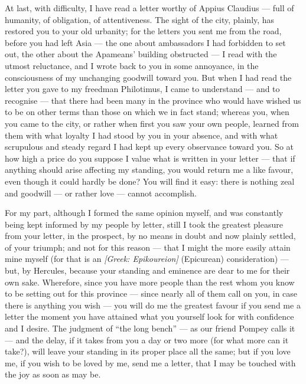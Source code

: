 

 At last, with difficulty, I have read a letter worthy of Appius Claudius --- full of humanity, of obligation, of attentiveness. The sight of the city, plainly, has restored you to your old urbanity; for the letters you sent me from the road, before you had left Asia --- the one about ambassadors I had forbidden to set out, the other about the Apameans' building obstructed --- I read with the utmost reluctance, and I wrote back to you in some annoyance, in the consciousness of my unchanging goodwill toward you. But when I had read the letter you gave to my freedman Philotimus, I came to understand --- and to recognise --- that there had been many in the province who would have wished us to be on other terms than those on which we in fact stand; whereas you, when you came to the city, or rather when first you saw your own people, learned from them with what loyalty I had stood by you in your absence, and with what scrupulous and steady regard I had kept up every observance toward you. So at how high a price do you suppose I value what is written in your letter --- that if anything should arise affecting my standing, you would return me a like favour, even though it could hardly be done? You will find it easy: there is nothing zeal and goodwill --- or rather love --- cannot accomplish.

 For my part, although I formed the same opinion myself, and was constantly being kept informed by my people by letter, still I took the greatest pleasure from your letter, in the prospect, by no means in doubt and now plainly settled, of your triumph; and not for this reason --- that I might the more easily attain mine myself (for that is an \textit{[Greek: Epikoureion]} (Epicurean) consideration) --- but, by Hercules, because your standing and eminence are dear to me for their own sake. Wherefore, since you have more people than the rest whom you know to be setting out for this province --- since nearly all of them call on you, in case there is anything you wish --- you will do me the greatest favour if you send me a letter the moment you have attained what you yourself look for with confidence and I desire. The judgment of ``the long bench'' --- as our friend Pompey calls it --- and the delay, if it takes from you a day or two more (for what more can it take?), will leave your standing in its proper place all the same; but if you love me, if you wish to be loved by me, send me a letter, that I may be touched with the joy as soon as may be.

